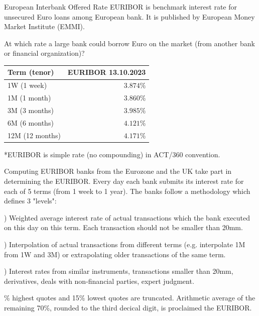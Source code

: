 \documentclass{beamer}
\begin{document}
\begin{frame}{European Interbank Offered Rate}
\justify
\alert{EURIBOR} is benchmark interest rate for unsecured Euro loans among European bank. It is published by European Money Market Institute (EMMI).

\justify
At which rate a large bank could borrow Euro on the market (from another bank or financial organization)?

\justify
\centering
\begin{tabular}{l|r}
Term (tenor)     & EURIBOR 13.10.2023 \\ \hline
1W (1 week)    & $3.874\%$ \\
1M (1 month)     & $3.860\%$ \\
3M (3 months)    & $3.985\%$ \\
6M (6 months)   & $4.121\%$ \\
12M (12 months) & $4.171\%$ 
\end{tabular}

\justify
*EURIBOR is simple rate (no compounding) in ACT/360 convention.
\end{frame}



\begin{frame}{Computing EURIBOR}
 banks from the Eurozone and the UK take part in determining the EURIBOR. Every day each bank submits its interest rate for each of 5 terms (from 1 week to 1 year). The banks follow a methodology which defines 3 "levels":

) Weighted average interest rate of actual transactions which the bank executed on this day on this term. Each transaction should not be smaller than 20mm.

) Interpolation of actual transactions from different terms (e.g. interpolate 1M from 1W and 3M) or extrapolating older transactions of the same term.

) Interest rates from similar instruments, transactions smaller than 20mm, derivatives, deals with non-financial parties, expert judgment. 

\% highest quotes and 15\% lowest quotes are truncated. Arithmetic average of the remaining 70\%, rounded to the third decical digit, is proclaimed the EURIBOR.
\end{frame}
\end{document}
